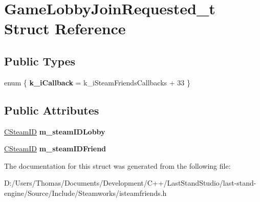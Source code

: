 \hypertarget{structGameLobbyJoinRequested__t}{}\section{Game\+Lobby\+Join\+Requested\+\_\+t Struct Reference}
\label{structGameLobbyJoinRequested__t}
\subsection*{Public Types}
\begin{DoxyCompactItemize}
\item 
\hypertarget{structGameLobbyJoinRequested__t_aaca3064004c6fc79306481335e262868}{}enum \{ {\bfseries k\+\_\+i\+Callback} = k\+\_\+i\+Steam\+Friends\+Callbacks + 33
 \}\label{structGameLobbyJoinRequested__t_aaca3064004c6fc79306481335e262868}

\end{DoxyCompactItemize}
\subsection*{Public Attributes}
\begin{DoxyCompactItemize}
\item 
\hypertarget{structGameLobbyJoinRequested__t_ac29bd3b647e9707fc3d65ff84c364fd0}{}\hyperlink{classCSteamID}{C\+Steam\+I\+D} {\bfseries m\+\_\+steam\+I\+D\+Lobby}\label{structGameLobbyJoinRequested__t_ac29bd3b647e9707fc3d65ff84c364fd0}

\item 
\hypertarget{structGameLobbyJoinRequested__t_a324ce97b80ea674c630cbd51cc35fe72}{}\hyperlink{classCSteamID}{C\+Steam\+I\+D} {\bfseries m\+\_\+steam\+I\+D\+Friend}\label{structGameLobbyJoinRequested__t_a324ce97b80ea674c630cbd51cc35fe72}

\end{DoxyCompactItemize}


The documentation for this struct was generated from the following file\+:\begin{DoxyCompactItemize}
\item 
D\+:/\+Users/\+Thomas/\+Documents/\+Development/\+C++/\+Last\+Stand\+Studio/last-\/stand-\/engine/\+Source/\+Include/\+Steamworks/isteamfriends.\+h\end{DoxyCompactItemize}
